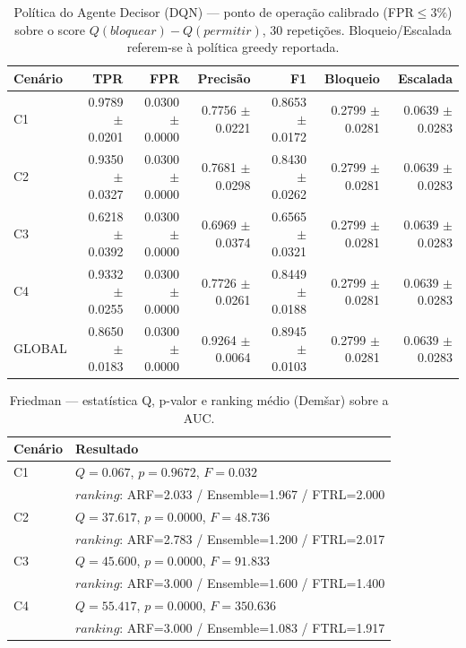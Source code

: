 \begin{table}[htbp]
\centering
\caption{Política do Agente Decisor (DQN) — ponto de operação calibrado (FPR$\le 3\%$) sobre o score $Q(bloquear)-Q(permitir)$, 30 repetições. Bloqueio/Escalada referem-se à política greedy reportada.}
\label{tab:8-5}
\begin{tabular}{lrrrrrr}
\toprule
Cen\'ario & TPR & FPR & Precis\~ao & F1 & Bloqueio & Escalada \\
\midrule
C1 & 0.9789 $\pm$ 0.0201 & 0.0300 $\pm$ 0.0000 & 0.7756 $\pm$ 0.0221 & 0.8653 $\pm$ 0.0172 & 0.2799 $\pm$ 0.0281 & 0.0639 $\pm$ 0.0283 \\
C2 & 0.9350 $\pm$ 0.0327 & 0.0300 $\pm$ 0.0000 & 0.7681 $\pm$ 0.0298 & 0.8430 $\pm$ 0.0262 & 0.2799 $\pm$ 0.0281 & 0.0639 $\pm$ 0.0283 \\
C3 & 0.6218 $\pm$ 0.0392 & 0.0300 $\pm$ 0.0000 & 0.6969 $\pm$ 0.0374 & 0.6565 $\pm$ 0.0321 & 0.2799 $\pm$ 0.0281 & 0.0639 $\pm$ 0.0283 \\
C4 & 0.9332 $\pm$ 0.0255 & 0.0300 $\pm$ 0.0000 & 0.7726 $\pm$ 0.0261 & 0.8449 $\pm$ 0.0188 & 0.2799 $\pm$ 0.0281 & 0.0639 $\pm$ 0.0283 \\
GLOBAL & 0.8650 $\pm$ 0.0183 & 0.0300 $\pm$ 0.0000 & 0.9264 $\pm$ 0.0064 & 0.8945 $\pm$ 0.0103 & 0.2799 $\pm$ 0.0281 & 0.0639 $\pm$ 0.0283 \\
\bottomrule
\end{tabular}
\end{table}

\begin{table}[htbp]
\centering
\caption{Friedman — estatística Q, p-valor e ranking médio (Demšar) sobre a AUC.}
\label{tab:8-6}
\begin{tabular}{ll}
\toprule
Cenário & Resultado \\
\midrule

C1 & $Q=0.067$, $p=0.9672$, $F=0.032$ \\
  & $ranking$: ARF=2.033 / Ensemble=1.967 / FTRL=2.000 \\

C2 & $Q=37.617$, $p=0.0000$, $F=48.736$ \\
  & $ranking$: ARF=2.783 / Ensemble=1.200 / FTRL=2.017 \\

C3 & $Q=45.600$, $p=0.0000$, $F=91.833$ \\
  & $ranking$: ARF=3.000 / Ensemble=1.600 / FTRL=1.400 \\

C4 & $Q=55.417$, $p=0.0000$, $F=350.636$ \\
  & $ranking$: ARF=3.000 / Ensemble=1.083 / FTRL=1.917 \\

\bottomrule
\end{tabular}
\end{table}

